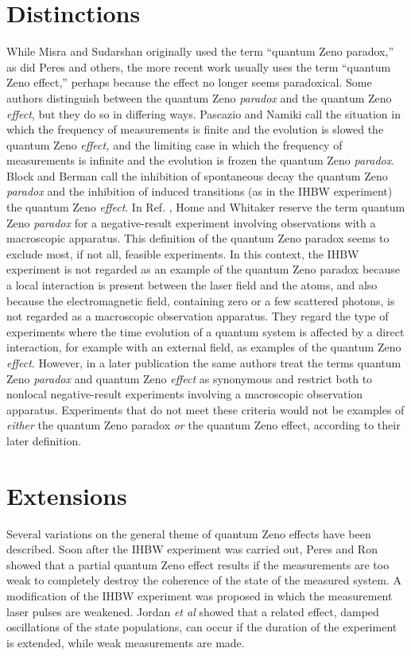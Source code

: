 \documentclass[12pt]{article}
\begin{document}
\section{Distinctions}

While Misra and Sudarshan originally used the term ``quantum Zeno
paradox,'' as did Peres \cite{peres80} and others, the more recent
work usually uses the term ``quantum Zeno effect,'' perhaps because
the effect no longer seems paradoxical.  Some authors distinguish
between the quantum Zeno {\em paradox} and the quantum Zeno {\em
effect}, but they do so in differing ways. Pascazio and Namiki
\cite{pascazio94} call the situation in which the frequency of
measurements is finite and the evolution is slowed the quantum Zeno
{\em effect,} and the limiting case in which the frequency of
measurements is infinite and the evolution is frozen the quantum
Zeno {\em paradox}.   Block and Berman \cite{block91} call the
inhibition of spontaneous decay the quantum Zeno {\em paradox} and
the inhibition of induced transitions (as in the IHBW experiment)
the quantum Zeno {\em effect}. In Ref. \cite{home92}, Home and
Whitaker reserve the term quantum Zeno {\em paradox} for a
negative-result experiment involving observations with a macroscopic
apparatus.  This definition of the quantum Zeno paradox seems to
exclude most, if not all, feasible experiments.  In this context,
the IHBW experiment is not regarded as an example of the quantum
Zeno paradox because a local interaction is present between the
laser field and the atoms, and also because the electromagnetic
field, containing zero or a few scattered photons, is not regarded
as a macroscopic observation apparatus.  They regard the type of
experiments where the time evolution of a quantum system is affected
by a direct interaction, for example with an external field, as
examples of the quantum Zeno {\em effect}.  However, in a later
publication \cite{home97} the same authors treat the terms quantum
Zeno {\em paradox} and quantum Zeno {\em effect} as synonymous and
restrict both to nonlocal negative-result experiments involving a
macroscopic observation apparatus.  Experiments that do not meet
these criteria would not be examples of {\em either} the quantum
Zeno paradox {\em or} the quantum Zeno effect, according to their
later definition.

\section{Extensions}


Several variations on the general theme of quantum Zeno effects have
been described.   Soon after the IHBW experiment was carried out,
Peres and Ron \cite{peres90} showed that a partial quantum Zeno
effect results if the measurements are too weak to completely
destroy the coherence of the state of the measured system.  A
modification of the IHBW experiment was proposed in which the
measurement laser pulses are weakened.  Jordan {\em et al}
\cite{jordan91} showed that a related effect, damped oscillations of
the state populations, can occur if the duration of the experiment
is extended, while weak measurements are made.
\end{document}
